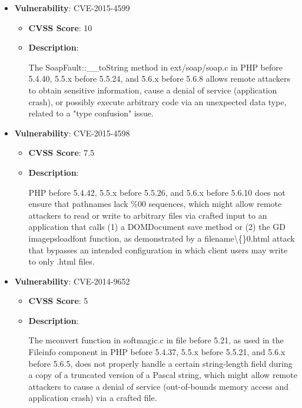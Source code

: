 \documentclass{article}
\begin{document}
\begin{itemize}
        \item \textbf{Vulnerability}: CVE-2015-4599
        \begin{itemize}
            \item \textbf{CVSS Score}:  10 
            \item \textbf{Description}:
            \parbox[t]{0.9\linewidth}{
                \ttfamily The SoapFault::\_\_toString method in ext/soap/soap.c in PHP before 5.4.40, 5.5.x before 5.5.24, and 5.6.x before 5.6.8 allows remote attackers to obtain sensitive information, cause a denial of service (application crash), or possibly execute arbitrary code via an unexpected data type, related to a "type confusion" issue.
            }
        \end{itemize}
    
        \item \textbf{Vulnerability}: CVE-2015-4598
        \begin{itemize}
            \item \textbf{CVSS Score}:  7.5 
            \item \textbf{Description}:
            \parbox[t]{0.9\linewidth}{
                \ttfamily PHP before 5.4.42, 5.5.x before 5.5.26, and 5.6.x before 5.6.10 does not ensure that pathnames lack \%00 sequences, which might allow remote attackers to read or write to arbitrary files via crafted input to an application that calls (1) a DOMDocument save method or (2) the GD imagepsloadfont function, as demonstrated by a filename\textbackslash\{\}0.html attack that bypasses an intended configuration in which client users may write to only .html files.
            }
        \end{itemize}
    
        \item \textbf{Vulnerability}: CVE-2014-9652
        \begin{itemize}
            \item \textbf{CVSS Score}:  5 
            \item \textbf{Description}:
            \parbox[t]{0.9\linewidth}{
                \ttfamily The mconvert function in softmagic.c in file before 5.21, as used in the Fileinfo component in PHP before 5.4.37, 5.5.x before 5.5.21, and 5.6.x before 5.6.5, does not properly handle a certain string-length field during a copy of a truncated version of a Pascal string, which might allow remote attackers to cause a denial of service (out-of-bounds memory access and application crash) via a crafted file.
            }
        \end{itemize}
    

\end{itemize}
\end{document}

